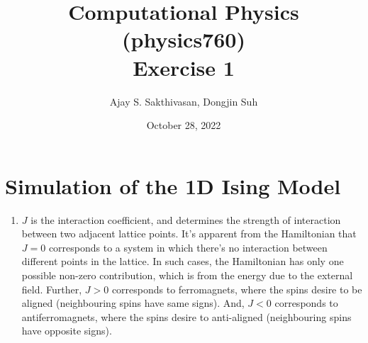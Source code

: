 \documentclass{article}
\title{Computational Physics (physics760) \\ Exercise 1}
\author{Ajay S. Sakthivasan, Dongjin Suh}
\date{October 28, 2022}
\begin{document}
\maketitle

\section{Simulation of the 1D Ising Model}
\begin{enumerate}
    \item $J$ is the interaction coefficient, and determines the strength of interaction between two adjacent lattice points. It's apparent from the Hamiltonian that $J = 0$ corresponds to a system in which there's no interaction between different points in the lattice. In such cases, the Hamiltonian has only one possible non-zero contribution, which is from the energy due to the external field. Further, $J>0$ corresponds to ferromagnets, where the spins desire to be aligned (neighbouring spins have same signs). And, $J<0$ corresponds to antiferromagnets, where the spins desire to anti-aligned (neighbouring spins have opposite signs).
\end{enumerate}
\end{document}
